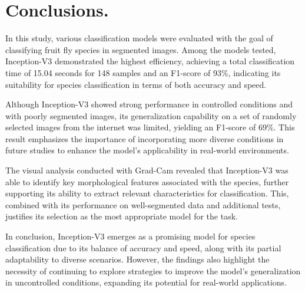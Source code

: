 \section{Conclusions.}  
In this study, various classification models were evaluated with the goal of classifying fruit fly species in segmented images. Among the models tested, Inception-V3 demonstrated the highest efficiency, achieving a total classification time of 15.04 seconds for 148 samples and an F1-score of 93\%, indicating its suitability for species classification in terms of both accuracy and speed.

Although Inception-V3 showed strong performance in controlled conditions and with poorly segmented images, its generalization capability on a set of randomly selected images from the internet was limited, yielding an F1-score of 69\%. This result emphasizes the importance of incorporating more diverse conditions in future studies to enhance the model's applicability in real-world environments.

The visual analysis conducted with Grad-Cam revealed that Inception-V3 was able to identify key morphological features associated with the species, further supporting its ability to extract relevant characteristics for classification. This, combined with its performance on well-segmented data and additional tests, justifies its selection as the most appropriate model for the task.

In conclusion, Inception-V3 emerges as a promising model for species classification due to its balance of accuracy and speed, along with its partial adaptability to diverse scenarios. However, the findings also highlight the necessity of continuing to explore strategies to improve the model's generalization in uncontrolled conditions, expanding its potential for real-world applications.
